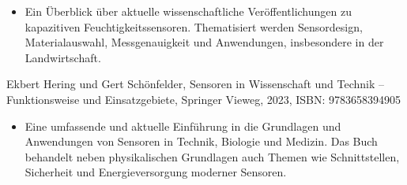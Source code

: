 		\begin{itemize}
			\item Ein Überblick über aktuelle wissenschaftliche Veröffentlichungen zu kapazitiven Feuchtigkeitssensoren. Thematisiert werden Sensordesign, Materialauswahl, Messgenauigkeit und Anwendungen, insbesondere in der Landwirtschaft.
		\end{itemize}
		
		\vspace{1\baselineskip}
		
		Ekbert Hering und Gert Schönfelder, Sensoren in Wissenschaft und Technik – Funktionsweise und Einsatzgebiete, Springer Vieweg, 2023, ISBN: 9783658394905 \cite{Ekbert:2023} 
		\begin{itemize}
			\item 	Eine umfassende und aktuelle Einführung in die Grundlagen und Anwendungen von Sensoren in Technik, Biologie und Medizin. Das Buch behandelt neben physikalischen Grundlagen auch Themen wie Schnittstellen, Sicherheit und Energieversorgung moderner Sensoren.
		\end{itemize}